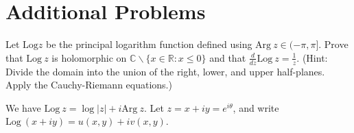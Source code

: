 \documentclass{article}
\newcounter{Problem}
\newenvironment{Problem}{\begin{Exercise}[name={Problem},
                                          counter={Problem}]}
                        {\end{Exercise}}
\begin{document}
\section{Additional Problems}

\begin{Problem}
  Let $\mathrm{Log} z$ be the principal logarithm function
  defined using $\mathrm{Arg}~z \in (-\pi, \pi]$. Prove that
  $\mathrm{Log}~z$ is holomorphic on
  $\mathbb{C} \backslash \{x \in \mathbb{R} : x \leq 0 \}$ and
  that $\frac{d}{dz} \mathrm{Log}~z = \frac{1}{z}$.
  (Hint: Divide the domain into the union of the right, lower, and
  upper half-planes. Apply the Cauchy-Riemann equations.)
\end{Problem}

\begin{Answer}
  We have $\mathrm{Log}~z = \log |z| + i \mathrm{Arg}~z$.
  Let $z = x + iy = e^{i \theta}$, and write
  $\mathrm{Log}~(x + iy) = u(x, y) + i v(x, y)$.


\end{Answer}
\end{document}
